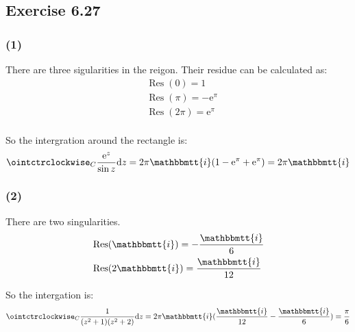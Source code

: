 \documentclass[]{ctexart}
\newcommand{\mi}{\mathbbmtt{i}}
\newcommand{\di}{\mathrm{d}}
\newcommand{\me}{\mathrm{e}}
\begin{document}
	\subsection{Exercise 6.27}
	\subsubsection*{(1)}
		There are three sigularities in the reigon. Their residue can be calculated as:
			\begin{equation*}
			\begin{aligned}
				&\operatorname{Res}(0)=1\\
				&\operatorname{Res}(\pi)=-\me^{\pi}\\
				&\operatorname{Res}(2\pi)=\me^{\pi}\\
			\end{aligned}
			\end{equation*}
			
		So the intergration around the rectangle is:
			\begin{equation*}
			\begin{aligned}
				\ointctrclockwise_C\frac{\me^z}{\sin z}\di z=2\pi \mi (1-\me^{\pi}+\me^{\pi})=2\pi \mi 
			\end{aligned}
			\end{equation*}
			
		\subsubsection*{(2)}
			There are two singularities.
				\begin{equation*}
				\begin{aligned}
					&\operatorname{Res}(\mi)=-\frac{\mi}{6}\\
					&\operatorname{Res}(2\mi)=\frac{\mi}{12}
				\end{aligned}
				\end{equation*}
				
			So the intergation is:
				\begin{equation*}
				\begin{aligned}
					\ointctrclockwise_C\frac{1}{(z^2+1)(z^2+2)}\di z=2\pi \mi (\frac{\mi}{12}-\frac{\mi}{6})=\frac{\pi}{6}
				\end{aligned}
				\end{equation*}
				
\end{document}
